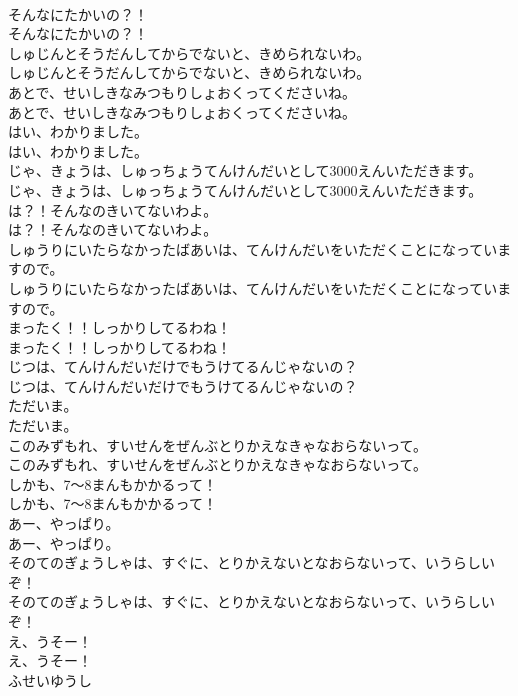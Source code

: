 \documentclass[8pt]{extreport}
\begin{document}
\begin{CJK}{UTF8}{min}
\\	そんなにたかいの？！	
\\	そんなにたかいの？！ 
\\	しゅじんとそうだんしてからでないと、きめられないわ。	
\\	しゅじんとそうだんしてからでないと、きめられないわ。 
\\	あとで、せいしきなみつもりしょおくってくださいね。	
\\	あとで、せいしきなみつもりしょおくってくださいね。 
\\	はい、わかりました。	
\\	はい、わかりました。 
\\	じゃ、きょうは、しゅっちょうてんけんだいとして3000えんいただきます。	
\\	じゃ、きょうは、しゅっちょうてんけんだいとして3000えんいただきます。 
\\	は？！そんなのきいてないわよ。	
\\	は？！そんなのきいてないわよ。 
\\	しゅうりにいたらなかったばあいは、てんけんだいをいただくことになっていますので。	
\\	しゅうりにいたらなかったばあいは、てんけんだいをいただくことになっていますので。 
\\	まったく！！しっかりしてるわね！	
\\	まったく！！しっかりしてるわね！ 
\\	じつは、てんけんだいだけでもうけてるんじゃないの？	
\\	じつは、てんけんだいだけでもうけてるんじゃないの？ 
\\	ただいま。	
\\	ただいま。 
\\	このみずもれ、すいせんをぜんぶとりかえなきゃなおらないって。	
\\	このみずもれ、すいせんをぜんぶとりかえなきゃなおらないって。 
\\	しかも、7～8まんもかかるって！	
\\	しかも、7～8まんもかかるって！ 
\\	あー、やっぱり。	
\\	あー、やっぱり。 
\\	そのてのぎょうしゃは、すぐに、とりかえないとなおらないって、いうらしいぞ！	
\\	そのてのぎょうしゃは、すぐに、とりかえないとなおらないって、いうらしいぞ！ 
\\	え、うそー！	
\\	え、うそー！ 
\\	ふせいゆうし

\end{CJK}
\end{document}
